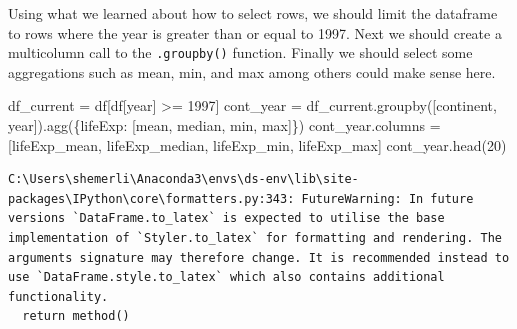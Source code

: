 \documentclass[
  letterpaper,
  DIV=11,
  numbers=noendperiod]{scrreprt}
\newenvironment{Shaded}{\begin{snugshade}}{\end{snugshade}}
\newcommand{\DecValTok}[1]{\textcolor[rgb]{0.68,0.00,0.00}{#1}}
\newcommand{\NormalTok}[1]{\textcolor[rgb]{0.00,0.23,0.31}{#1}}
\newcommand{\OperatorTok}[1]{\textcolor[rgb]{0.37,0.37,0.37}{#1}}
\newcommand{\StringTok}[1]{\textcolor[rgb]{0.13,0.47,0.30}{#1}}
\begin{document}
\begin{tcolorbox}[enhanced jigsaw, colframe=quarto-callout-note-color-frame, toprule=.15mm, colback=white, leftrule=.75mm, rightrule=.15mm, breakable, colbacktitle=quarto-callout-note-color!10!white, arc=.35mm, bottomtitle=1mm, bottomrule=.15mm, titlerule=0mm, title={Solution to Challenge 4}, toptitle=1mm, left=2mm, opacityback=0, coltitle=black, opacitybacktitle=0.6]

Using what we learned about how to select rows, we should limit the
dataframe to rows where the year is greater than or equal to 1997. Next
we should create a multicolumn call to the \texttt{.groupby()} function.
Finally we should select some aggregations such as mean, min, and max
among others could make sense here.

\begin{Shaded}
\begin{Highlighting}[]
\NormalTok{df\_current }\OperatorTok{=}\NormalTok{ df[df[}\StringTok{\textquotesingle{}year\textquotesingle{}}\NormalTok{] }\OperatorTok{\textgreater{}=} \DecValTok{1997}\NormalTok{]}
\NormalTok{cont\_year }\OperatorTok{=}\NormalTok{ df\_current.groupby([}\StringTok{\textquotesingle{}continent\textquotesingle{}}\NormalTok{, }\StringTok{\textquotesingle{}year\textquotesingle{}}\NormalTok{]).agg(\{}\StringTok{\textquotesingle{}lifeExp\textquotesingle{}}\NormalTok{: [}\StringTok{\textquotesingle{}mean\textquotesingle{}}\NormalTok{, }\StringTok{\textquotesingle{}median\textquotesingle{}}\NormalTok{, }\StringTok{\textquotesingle{}min\textquotesingle{}}\NormalTok{, }\StringTok{\textquotesingle{}max\textquotesingle{}}\NormalTok{]\})}
\NormalTok{cont\_year.columns }\OperatorTok{=}\NormalTok{ [}\StringTok{\textquotesingle{}lifeExp\_mean\textquotesingle{}}\NormalTok{, }\StringTok{\textquotesingle{}lifeExp\_median\textquotesingle{}}\NormalTok{, }\StringTok{\textquotesingle{}lifeExp\_min\textquotesingle{}}\NormalTok{, }\StringTok{\textquotesingle{}lifeExp\_max\textquotesingle{}}\NormalTok{]}
\NormalTok{cont\_year.head(}\DecValTok{20}\NormalTok{)}
\end{Highlighting}
\end{Shaded}

\begin{verbatim}
C:\Users\shemerli\Anaconda3\envs\ds-env\lib\site-packages\IPython\core\formatters.py:343: FutureWarning: In future versions `DataFrame.to_latex` is expected to utilise the base implementation of `Styler.to_latex` for formatting and rendering. The arguments signature may therefore change. It is recommended instead to use `DataFrame.style.to_latex` which also contains additional functionality.
  return method()
\end{verbatim}


\end{tcolorbox}
\end{document}
